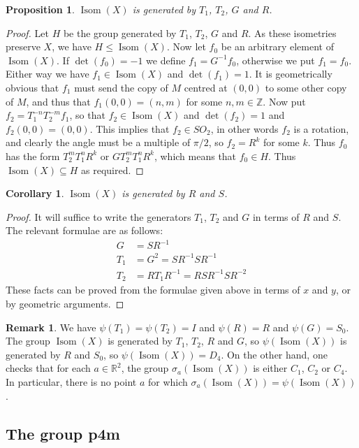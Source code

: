 \documentclass{amsart}
\DeclareMathOperator{\Isom}     {Isom}
\newcommand{\Z}         {{\mathbb{Z}}}
\newcommand{\R}         {{\mathbb{R}}}
\newcommand{\sse}       {\subseteq}
\newcommand{\sg}        {\sigma}
\renewcommand{\:}{\colon}
\newtheorem{proposition}[theorem]{Proposition}
\newtheorem{corollary}[theorem]{Corollary}
\theoremstyle{definition}
\newtheorem{remark}[theorem]{Remark}
\begin{document}
\begin{proposition}
 $\Isom(X)$ is generated by $T_1$, $T_2$, $G$ and $R$.
\end{proposition}
\begin{proof}
 Let $H$ be the group generated by $T_1$, $T_2$, $G$ and $R$.  As
 these isometries preserve $X$, we have $H\leq \Isom(X)$.  Now let $f_0$
 be an arbitrary element of $\Isom(X)$.  If $\det(f_0)=-1$ we define
 $f_1=G^{-1}f_0$, otherwise we put $f_1=f_0$.  Either way we have
 $f_1\in \Isom(X)$ and $\det(f_1)=1$.  It is geometrically obvious that
 $f_1$ must send the copy of $M$ centred at $(0,0)$ to some other copy
 of $M$, and thus that $f_1(0,0)=(n,m)$ for some $n,m\in\Z$.  Now put
 $f_2=T_1^{-n}T_2^{-m}f_1$, so that $f_2\in \Isom(X)$ and $\det(f_2)=1$
 and $f_2(0,0)=(0,0)$.  This implies that $f_2\in SO_2$, in other
 words $f_2$ is a rotation, and clearly the angle must be a multiple
 of $\pi/2$, so $f_2=R^k$ for some $k$.  Thus $f_0$ has the form
 $T_2^m T_1^n R^k$ or $GT_2^m T_1^n R^k$, which means that $f_0\in H$.
 Thus $\Isom(X)\sse H$ as required.
\end{proof}

\begin{corollary}
 $\Isom(X)$ is generated by $R$ and $S$.
\end{corollary}
\begin{proof}
 It will suffice to write the generators $T_1$, $T_2$ and $G$ in terms
 of $R$ and $S$.  The relevant formulae are as follows:
 \begin{align*}
  G   &= SR^{-1} \\
  T_1 &= G^2 = SR^{-1}SR^{-1} \\
  T_2 &= RT_1R^{-1} = RSR^{-1}SR^{-2}
 \end{align*}
 These facts can be proved from the formulae given above in terms of
 $x$ and $y$, or by geometric arguments.
\end{proof}

\begin{remark}
 We have $\psi(T_1)=\psi(T_2)=I$ and $\psi(R)=R$ and $\psi(G)=S_0$.
 The group $\Isom(X)$ is generated by $T_1$, $T_2$, $R$ and $G$, so
 $\psi(\Isom(X))$ is generated by $R$ and $S_0$, so $\psi(\Isom(X))=D_4$.  On
 the other hand, one checks that for each $a\in\R^2$, the group
 $\sg_a(\Isom(X))$ is either $C_1$, $C_2$ or $C_4$.  In particular, there
 is no point $a$ for which $\sg_a(\Isom(X))=\psi(\Isom(X))$.
\end{remark}

\subsection{The group p4m}
\label{subsec-p-four-m}
\end{document}

